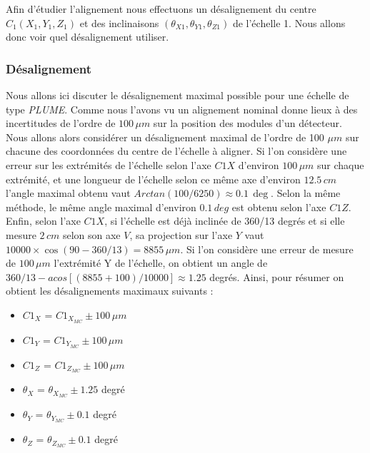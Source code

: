    \medskip
   
   Afin d'\'etudier l'alignement nous effectuons un d\'esalignement du centre $C_1(X_1,Y_1,Z_1)$ et des inclinaisons $(\theta_{X1}, \theta_{Y1}, \theta_{Z1})$ de l'\'echelle 1. Nous allons donc voir quel d\'esalignement utiliser.
   
  \subsubsection{D\'esalignement}
 
   Nous allons ici discuter le d\'esalignement maximal possible pour une \'echelle de type \textit{PLUME}. Comme nous l'avons vu un alignement nominal donne lieux \`a des incertitudes de l'ordre de $100 \, \mu m$ sur la position des modules d'un d\'etecteur. Nous allons alors consid\'erer un d\'esalignement maximal de l'ordre de 100 $\mu m$ sur chacune des coordonn\'ees du centre de l'\'echelle \`a aligner. Si l'on consid\`ere une erreur sur les extr\'emités de l'\'echelle selon l'axe $C1X$ d'environ $100 \, \mu m$ sur chaque extr\'emit\'e, et une longueur de l'\'echelle selon ce m\^eme axe d'environ $12.5 \, cm$ l'angle maximal obtenu vaut $Arctan(100/6250) \approx 0.1 \, \deg$. Selon la m\^eme m\'ethode, le même angle maximal d'environ $0.1 \, deg$ est obtenu selon l'axe $C1Z$. Enfin, selon l'axe $C1X$, si l'\'echelle est d\'ej\`a inclin\'ee de 360/13 degr\'es et si elle mesure $2 \, cm$ selon son axe $V$, sa projection sur l'axe $Y$ vaut $10000 \times \cos(90-360/13) = 8855 \, \mu m$. Si l'on consid\`ere une erreur de mesure de $100 \, \mu m$ l'extr\'emité  Y de l'échelle, on obtient un angle de $360/13 - acos[(8855+100)/10000] \approx 1.25$ degr\'es. Ainsi, pour r\'esumer on obtient les d\'esalignements maximaux suivants :
  
  \medskip
   
  \renewcommand{\labelitemi}{$\bullet$}
  
  \begin{itemize}
   \item $C1_X$ = $C1_{X_{MC}} \pm 100 \, \mu m$ 
   \item $C1_Y$ = $C1_{Y_{MC}} \pm 100 \, \mu m$ 
   \item $C1_Z$ = $C1_{Z_{MC}} \pm 100 \, \mu m$
   \item $\theta_X$ = $\theta_{X_{MC}} \pm 1.25$ degr\'e 
   \item $\theta_Y$ = $\theta_{Y_{MC}} \pm 0.1$ degr\'e 
   \item $\theta_Z$ = $\theta_{Z_{MC}} \pm 0.1$ degr\'e
  \end{itemize}
  
